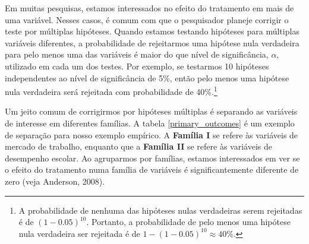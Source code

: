Em muitas pesquisas, estamos interessados no efeito do tratamento em mais de uma variável. Nesses casos, é comum com que o pesquisador planeje corrigir o teste por múltiplas hipóteses. Quando estamos testando hipóteses para múltiplas variáveis diferentes, a probabilidade de rejeitarmos uma hipótese nula verdadeira para pelo menos uma das variáveis é maior do que nível de significância, $\alpha$, utilizado em cada um dos testes. Por exemplo, se testarmos 10 hipóteses independentes ao nível de significância de 5\%, então pelo menos uma hipótese nula verdadeira será rejeitada com probabilidade de 40\%.\footnote{A probabilidade de nenhuma das hipóteses nulas verdadeiras serem rejeitadas é de $(1-0.05)^{10}$. Portanto, a probabilidade de pelo menos uma hipótese nula verdadeira ser rejeitada é de $1 - (1-0.05)^{10} \approx 40\%$.}

Um jeito comum de corrigirmos por hipóteses múltiplas é separando as variáveis de interesse em diferentes famílias. A tabela \ref{primary_outcomes} é um exemplo de separação para nosso exemplo empírico. A \textbf{Família I} se refere às variáveis de mercado de trabalho, enquanto que a \textbf{Família II} se refere às variáveis de desempenho escolar. Ao agruparmos por famílias, estamos interessados em ver se o efeito do tratamento numa família de variáveis é significantemente diferente de zero (veja Anderson, 2008).


\begin{table}[h]
\centering
\caption{\sc Famílias de Variáveis de Interesse}
\label{primary_outcomes}

\end{table}

